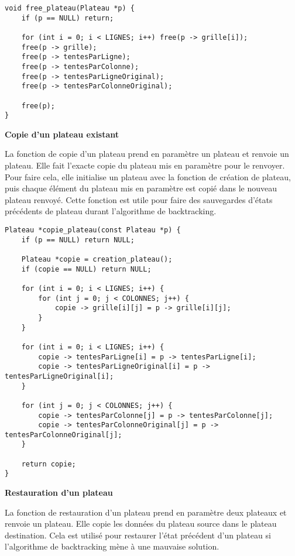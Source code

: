 \documentclass{article}
\begin{document}
\begin{lstlisting}[style=Cstyle]
void free_plateau(Plateau *p) {
    if (p == NULL) return;

    for (int i = 0; i < LIGNES; i++) free(p -> grille[i]);
    free(p -> grille);
    free(p -> tentesParLigne);
    free(p -> tentesParColonne);
    free(p -> tentesParLigneOriginal);
    free(p -> tentesParColonneOriginal);

    free(p);
}
\end{lstlisting}

\textbf{Copie d'un plateau existant}

La fonction de copie d'un plateau prend en paramètre un plateau et renvoie un plateau. Elle fait l'exacte copie du plateau mis en paramètre pour le renvoyer. Pour faire cela, elle initialise un plateau avec la fonction de création de plateau, puis chaque élément du plateau mis en paramètre est copié dans le nouveau plateau renvoyé. Cette fonction est utile pour faire des sauvegardes d'états précédents de plateau durant l'algorithme de backtracking.
\begin{lstlisting}[style=Cstyle]
Plateau *copie_plateau(const Plateau *p) {
    if (p == NULL) return NULL;

    Plateau *copie = creation_plateau();
    if (copie == NULL) return NULL;

    for (int i = 0; i < LIGNES; i++) {
        for (int j = 0; j < COLONNES; j++) {
            copie -> grille[i][j] = p -> grille[i][j];
        }
    }

    for (int i = 0; i < LIGNES; i++) {
        copie -> tentesParLigne[i] = p -> tentesParLigne[i];
        copie -> tentesParLigneOriginal[i] = p -> tentesParLigneOriginal[i];
    }

    for (int j = 0; j < COLONNES; j++) {
        copie -> tentesParColonne[j] = p -> tentesParColonne[j];
        copie -> tentesParColonneOriginal[j] = p -> tentesParColonneOriginal[j];
    }

    return copie;
}
\end{lstlisting}

\textbf{Restauration d'un plateau}

La fonction de restauration d'un plateau prend en paramètre deux plateaux et renvoie un plateau. Elle copie les données du plateau source dans le plateau destination. Cela est utilisé pour restaurer l'état précédent d'un plateau si l'algorithme de backtracking mène à une mauvaise solution.
\end{document}
